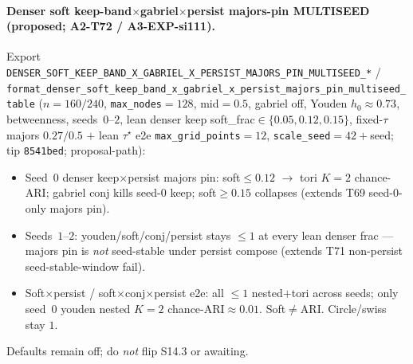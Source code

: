 \documentclass[11pt]{article}
\begin{document}
\paragraph{Denser soft keep-band$\times$gabriel$\times$persist majors-pin
MULTISEED (proposed; A2-T72 / A3-EXP-si111).}
Export
\texttt{DENSER\_SOFT\_KEEP\_BAND\_X\_GABRIEL\_X\_PERSIST\_MAJORS\_PIN\_MULTISEED\_*} /
\texttt{format\_denser\_soft\_keep\_band\_x\_gabriel\_x\_persist\_majors\_pin\_multiseed\_table}
($n{=}160/240$, \texttt{max\_nodes}${=}128$, mid${=}0.5$, gabriel off,
Youden $h_0\approx 0.73$, betweenness, seeds~$0$--$2$, lean denser keep
soft\_frac$\in\{0.05,0.12,0.15\}$, fixed-$\tau$ majors $0.27/0.5$ $+$ lean
$\tau^\star$ e2e \texttt{max\_grid\_points}${=}12$,
\texttt{scale\_seed}${=}42{+}$seed; tip \texttt{8541bed}; proposal-path):
\begin{itemize}[leftmargin=1.5em]
  \item Seed~$0$ denser keep$\times$persist majors pin: soft$\le 0.12$ $\to$
  tori $K{=}2$ chance-ARI; gabriel conj kills seed-$0$ keep;
  soft$\ge 0.15$ collapses (extends T69 seed-$0$-only majors pin).
  \item Seeds~$1$--$2$: youden/soft/conj/persist stays $\le 1$ at every lean
  denser frac --- majors pin is \emph{not} seed-stable under persist
  compose (extends T71 non-persist seed-stable-window fail).
  \item Soft$\times$persist / soft$\times$conj$\times$persist e2e: all
  $\le 1$ nested$+$tori across seeds; only seed~$0$ youden nested $K{=}2$
  chance-ARI$\approx 0.01$. Soft$\neq$ARI. Circle/swiss stay $1$.
\end{itemize}
Defaults remain off; do \emph{not} flip S14.3 or awaiting.
\end{document}

